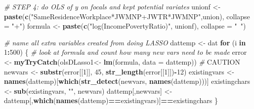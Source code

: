 \documentclass[
]{article}
\newenvironment{Shaded}{\begin{snugshade}}{\end{snugshade}}
\newcommand{\AlertTok}[1]{\textcolor[rgb]{0.94,0.16,0.16}{#1}}
\newcommand{\CommentTok}[1]{\textcolor[rgb]{0.56,0.35,0.01}{\textit{#1}}}
\newcommand{\ControlFlowTok}[1]{\textcolor[rgb]{0.13,0.29,0.53}{\textbf{#1}}}
\newcommand{\DataTypeTok}[1]{\textcolor[rgb]{0.13,0.29,0.53}{#1}}
\newcommand{\DecValTok}[1]{\textcolor[rgb]{0.00,0.00,0.81}{#1}}
\newcommand{\KeywordTok}[1]{\textcolor[rgb]{0.13,0.29,0.53}{\textbf{#1}}}
\newcommand{\NormalTok}[1]{#1}
\newcommand{\OperatorTok}[1]{\textcolor[rgb]{0.81,0.36,0.00}{\textbf{#1}}}
\newcommand{\StringTok}[1]{\textcolor[rgb]{0.31,0.60,0.02}{#1}}
\begin{document}
\begin{Shaded}
\begin{Highlighting}[]
\CommentTok{# STEP 4: do OLS of y on focals and kept potential variates}
\NormalTok{unionf <-}\StringTok{ }\KeywordTok{paste}\NormalTok{(}\KeywordTok{c}\NormalTok{(}\StringTok{"SameResidenceWorkplace*JWMNP+JWTR*JWMNP"}\NormalTok{,union), }\DataTypeTok{collapse =} \StringTok{"+"}\NormalTok{)}
\NormalTok{formula <-}\StringTok{ }\KeywordTok{paste}\NormalTok{(}\KeywordTok{c}\NormalTok{(}\StringTok{"log(IncomePovertyRatio)"}\NormalTok{, unionf), }\DataTypeTok{collapse =} \StringTok{"~"}\NormalTok{)}

\CommentTok{# name all extra variables created from doing LASSO}
\NormalTok{dattemp <-}\StringTok{ }\NormalTok{dat}
\ControlFlowTok{for}\NormalTok{ (i }\ControlFlowTok{in} \DecValTok{1}\OperatorTok{:}\DecValTok{500}\NormalTok{) \{ }\CommentTok{# look at formula and count how many new vars need to be made}
\NormalTok{  error <-}\StringTok{ }\KeywordTok{myTryCatch}\NormalTok{(olsDLasso1<-}\StringTok{ }\KeywordTok{lm}\NormalTok{(formula, }\DataTypeTok{data =}\NormalTok{ dattemp)) }\CommentTok{# }\AlertTok{CAUTION}
\NormalTok{  newvars <-}\StringTok{ }\KeywordTok{substr}\NormalTok{(error[[}\DecValTok{1}\NormalTok{]], }\DecValTok{45}\NormalTok{, }\KeywordTok{str_length}\NormalTok{(error[[}\DecValTok{1}\NormalTok{]])}\OperatorTok{-}\DecValTok{12}\NormalTok{)}
\NormalTok{  existingvars <-}\StringTok{ }\KeywordTok{names}\NormalTok{(dattemp)[}\KeywordTok{which}\NormalTok{(}\KeywordTok{str_detect}\NormalTok{(newvars, }\KeywordTok{names}\NormalTok{(dattemp)))]}
\NormalTok{  existingchars <-}\StringTok{ }\KeywordTok{sub}\NormalTok{(existingvars, }\StringTok{""}\NormalTok{, newvars)}
\NormalTok{  dattemp[,newvars] <-}\StringTok{ }\NormalTok{dattemp[,}\KeywordTok{which}\NormalTok{(}\KeywordTok{names}\NormalTok{(dattemp)}\OperatorTok{==}\NormalTok{existingvars)]}\OperatorTok{==}\NormalTok{existingchars}
\NormalTok{\}}
\end{Highlighting}
\end{Shaded}
\end{document}
